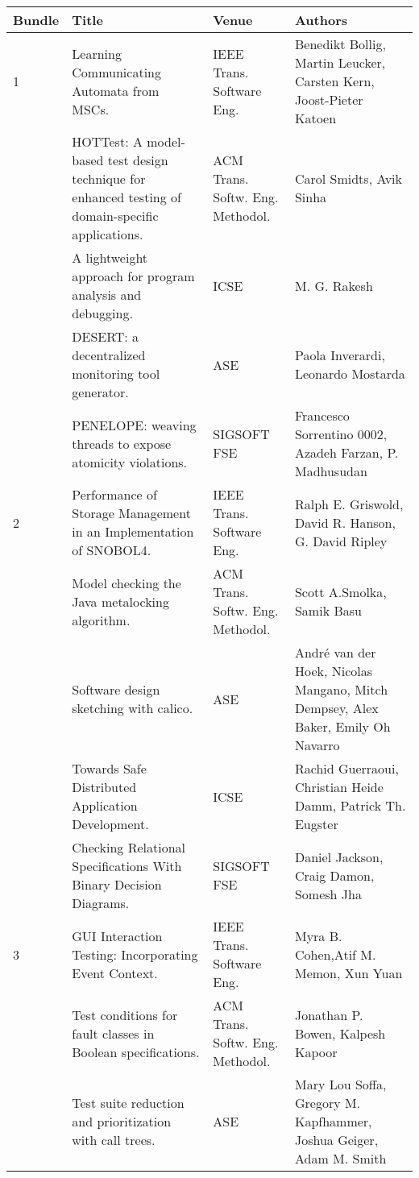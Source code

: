 \begin{table}[ht]
  \centering
  \resizebox{\textwidth}{!} {
    \begin{tabular}{|llll|}
    \hline
    Bundle & Title & Venue & Authors \\
    \hline
\rowcolor{black!20} 1 & Learning Communicating Automata from MSCs.& IEEE Trans. Software Eng.& 
Benedikt Bollig, Martin Leucker, Carsten Kern, Joost-Pieter Katoen \\
 & HOTTest: A model-based test design technique for enhanced testing of domain-specific 
applications.& ACM Trans. Softw. Eng. Methodol.& Carol Smidts, Avik Sinha \\
\rowcolor{black!20} & A lightweight approach for program analysis and debugging.& ICSE& M. G. Rakesh 
\\
 & DESERT: a decentralized monitoring tool generator.& ASE& Paola Inverardi, Leonardo Mostarda \\
\rowcolor{black!20} & PENELOPE: weaving threads to expose atomicity violations.& SIGSOFT FSE& 
Francesco Sorrentino 0002, Azadeh Farzan, P. Madhusudan \\
2 & Performance of Storage Management in an Implementation of SNOBOL4.& IEEE Trans. Software Eng.& 
Ralph E. Griswold, David R. Hanson, G. David Ripley \\
\rowcolor{black!20} & Model checking the Java metalocking algorithm.& ACM Trans. Softw. Eng. 
Methodol.& Scott A.Smolka, Samik Basu \\
 & Software design sketching with calico.& ASE& André van der Hoek, Nicolas Mangano, Mitch Dempsey, 
Alex Baker, Emily Oh Navarro \\
\rowcolor{black!20} & Towards Safe Distributed Application Development.& ICSE& Rachid Guerraoui, 
Christian Heide Damm, Patrick Th. Eugster \\
 & Checking Relational Specifications With Binary Decision Diagrams.& SIGSOFT FSE& Daniel Jackson, 
Craig Damon, Somesh Jha \\
\rowcolor{black!20} 3 & GUI Interaction Testing: Incorporating Event Context.& IEEE Trans. Software 
Eng.& Myra B. Cohen,Atif M. Memon, Xun Yuan \\
 & Test conditions for fault classes in Boolean specifications.& ACM Trans. Softw. Eng. Methodol.& 
Jonathan P. Bowen, Kalpesh Kapoor \\
\rowcolor{black!20} & Test suite reduction and prioritization with call trees.& ASE& Mary Lou Soffa, 
Gregory M. Kapfhammer, Joshua Geiger, Adam M. Smith \\

\end{tabular}}
\end{table}
